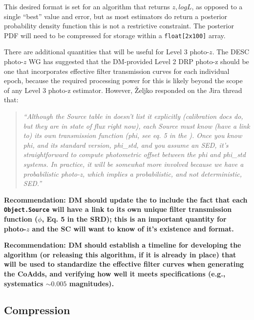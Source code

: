\documentclass[DM,lsstdraft,toc]{lsstdoc}
\begin{document}
\noindent This desired format is set for an algorithm that returns $z,logL$, as opposed to a single ``best'' value and error, but as most estimators do return a posterior probability density function this is not a restrictive constraint. The posterior PDF will need to be compressed for storage within a \texttt{float[2x100]} array.

There are additional quantities that will be useful for Level 3 photo-$z$. The DESC photo-$z$ WG has suggested that the DM-provided Level 2 DRP photo-z should be one that incorporates effective filter transmission curves for each individual epoch, because the required processing power for this is likely beyond the scope of any Level 3 photo-z estimator. However, \v{Z}eljko responded on the Jira thread that:

\begin{quote}
{\it ``Although the Source table in \DPDD doesn't list it explicitly (calibration docs do, but they are in state of flux right now), each Source must know (have a link to) its own transmission function (phi, see eq. 5 in the \SRD). Once you know phi, and its standard version, phi\_std, and you assume an SED, it's straightforward to compute photometric offset between the phi and phi\_std systems. In practice, it will be somewhat more involved because we have a probabilistic photo-z, which implies a probabilistic, and not deterministic, SED.''}
\end{quote}

\textbf{Recommendation:  DM should update the \DPDD to include the fact that each \texttt{Object.Source} will have a link to its own unique filter transmission function ($\phi$, Eq. 5 in the SRD); this is an important quantity for photo-$z$ and the SC will want to know of it's existence and format.}

\textbf{Recommendation: DM should establish a timeline for developing the algorithm (or releasing this algorithm, if it is already in place) that will be used to standardize the effective filter curves when generating the CoAdds, and verifying how well it meets specifications (e.g., systematics $\sim 0.005$ magnitudes).}

\subsection{Compression}\label{ssec:format_compression}
\end{document}
